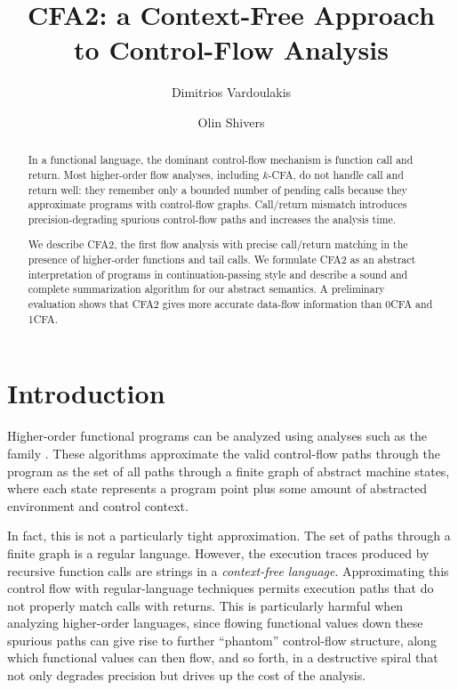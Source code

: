 \documentclass{LMCS}
\theoremstyle{definition} \newtheorem{property}[thm]{Property}
\begin{document}
\title{CFA2: a Context-Free Approach \\ to Control-Flow Analysis}

\author[D.~Vardoulakis]{Dimitrios Vardoulakis}
\address{Northeastern University} 

\author[O.~Shivers]{Olin Shivers}
\address{ pt} 



\newcommand{\myp}[1]{\tb{#1}}

\begin{abstract}
In a functional language, the dominant control-flow mechanism is function call
and return.
Most higher-order flow analyses, including $k$-CFA, do not handle call and 
return well: they remember only a bounded number of pending calls because they
approximate programs with control-flow graphs.
Call/return mismatch introduces precision-degrading spurious control-flow
paths and increases the analysis time.

We describe CFA2, the first flow analysis with precise call/return matching
in the presence of higher-order functions and tail calls.
We formulate CFA2 as an abstract interpretation of programs in 
continuation-passing style and describe a sound and complete summarization
algorithm for our abstract semantics.
A preliminary evaluation shows that CFA2 gives more accurate data-flow
information than 0CFA and 1CFA.
\end{abstract}

\maketitle

\section*{Introduction}

\noindent Higher-order functional programs can be analyzed using analyses such as the
\kcfa{} family \cite{diss/cmu/91/olin}.
These algorithms approximate the valid control-flow paths through the
program as the set of all paths through a finite graph of abstract
machine states, where each state represents a program point plus some
amount of abstracted environment and control context.

In fact, this is not a particularly tight approximation.
The set of paths through a finite graph is a regular language.
However, the execution traces produced by recursive 
function calls are strings in a \emph{context-free language}.
Approximating this control flow with regular-language techniques
permits execution paths that do not properly match calls with returns.
This is particularly harmful when analyzing higher-order languages, 
since flowing functional values down these spurious paths can 
give rise to further ``phantom'' control-flow structure, 
along which functional values can then flow, and so forth, 
in a destructive spiral that not only degrades precision but
drives up the cost of the analysis.
\end{document}
